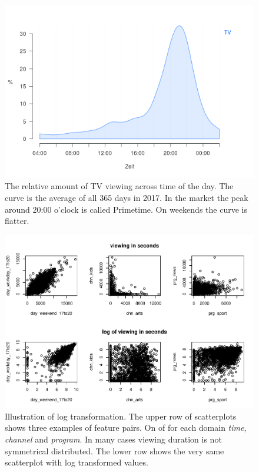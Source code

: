\documentclass[]{article}
\begin{document}
\begin{figure}[H]

{\centering \includegraphics[width=0.75\linewidth]{../data/tv-day} 

}

\caption{\label{fig:fig2} The relative amount of TV viewing across time of the day. The curve is the average of all 365 days in 2017. In the market the peak around 20:00 o'clock is called Primetime. On weekends the curve is flatter.}\label{fig:fig2}
\end{figure}

\begin{figure}
\centering
\includegraphics{Diploma_files/figure-latex/fig3-1.pdf}
\caption{\label{fig:fig3} Illustration of log transformation. The upper
row of scatterplots shows three examples of feature pairs. On of for
each domain \emph{time}, \emph{channel} and \emph{program}. In many
cases viewing duration is not symmetrical distributed. The lower row
shows the very same scatterplot with log transformed values.}
\end{figure}
\end{document}
